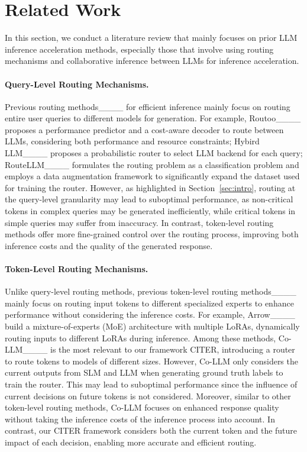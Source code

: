 \section{Related Work}
\label{sec:related}
\vspace{-1em}

In this section, we conduct a literature review that mainly focuses on prior LLM inference acceleration methods, especially those that involve using routing mechanisms and collaborative inference between LLMs for inference acceleration.
\vspace{-1em}
\paragraph{Query-Level Routing Mechanisms.} Previous routing methods____ for efficient inference mainly focus on routing entire user queries to different models for generation. For example, Routoo____ proposes a performance predictor and a cost-aware decoder to route between LLMs, considering both performance and resource constraints; Hybird LLM____ proposes a probabilistic router to select LLM backend for each query; RouteLLM____ formulates the routing problem as a classification problem and employs a data augmentation framework to significantly expand the dataset used for training the router.
However, as highlighted in Section~\ref{sec:intro}, routing at the query-level granularity may lead to suboptimal performance, as non-critical tokens in complex queries may be generated inefficiently, while critical tokens in simple queries may suffer from inaccuracy. In contrast, token-level routing methods offer more fine-grained control over the routing process, improving both inference costs and the quality of the generated response.

\vspace{-1em}
\paragraph{Token-Level Routing Mechanisms.} Unlike query-level routing methods, previous token-level routing methods____ mainly focus on routing input tokens to different specialized experts to enhance performance without considering the inference costs. For example, Arrow____ build a mixture-of-experts (MoE) architecture with multiple LoRAs, dynamically routing inputs to different LoRAs during inference.
Among these methods, Co-LLM____ is the most relevant to our framework CITER, introducing a router to route tokens to models of different sizes. However, Co-LLM only considers the current outputs from SLM and LLM when generating ground truth labels to train the router. This may lead to suboptimal performance since the influence of current decisions on future tokens is not considered. Moreover, similar to other token-level routing methods, Co-LLM focuses on enhanced response quality without taking the inference costs of the inference process into account. In contrast, our CITER framework considers both the current token and the future impact of each decision, enabling more accurate and efficient routing.
\vspace{-1em}
